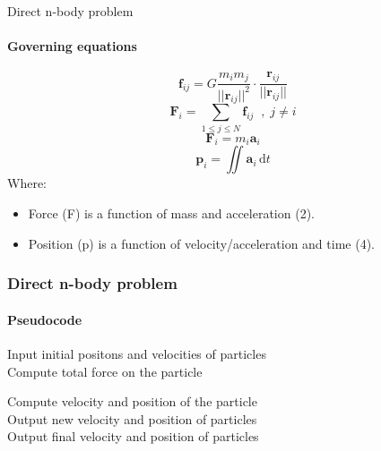 \documentclass{beamer}
\begin{document}
\begin{frame}{Direct n-body problem}
  \framesubtitle{Governing equations}
	\begin{equation}
	\textbf{f}_{ij} = G \frac{m_i m_j}{||\textbf{r}_{ij}||^2} \cdot \frac{\textbf{r}_{ij}}{||\textbf{r}_{ij}||}
	\end{equation}
	\begin{equation}
	\textbf{F}_i = \sum_{1 \le j \le N} \textbf{f}_{ij} \;\; ,\; j \ne i
	\end{equation}
	\begin{equation}
	\textbf{F}_i = m_i \textbf{a}_i
	\end{equation}
	\begin{equation}
	\textbf{p}_i = \iint \textbf{a}_i\,\textrm{d}t
	\end{equation}
Where:
	\begin{itemize}
	 	\item Force (F) is a function of mass and acceleration (2).
	 	\item Position (p) is a function of velocity/acceleration and time (4).
	\end{itemize}	 	
	
\end{frame}


\begin{frame}[fragile]
\frametitle{Direct n-body problem}
  \framesubtitle{Pseudocode}
	\begin{algorithm}[H]
	\begin{algorithmic}[1]


\STATE Input initial positons and velocities of particles
	\\
		\STATE Compute total force on the particle \\
	\ENDFOR
	
		\STATE Compute velocity and position of the particle\\
	\ENDFOR	
\STATE  Output new velocity and position of particles\\
\ENDWHILE
\STATE  Output final velocity and position of particles\\

\end{algorithmic}
\label{alg:seq}
\end{algorithm}
\end{frame}
\end{document}
